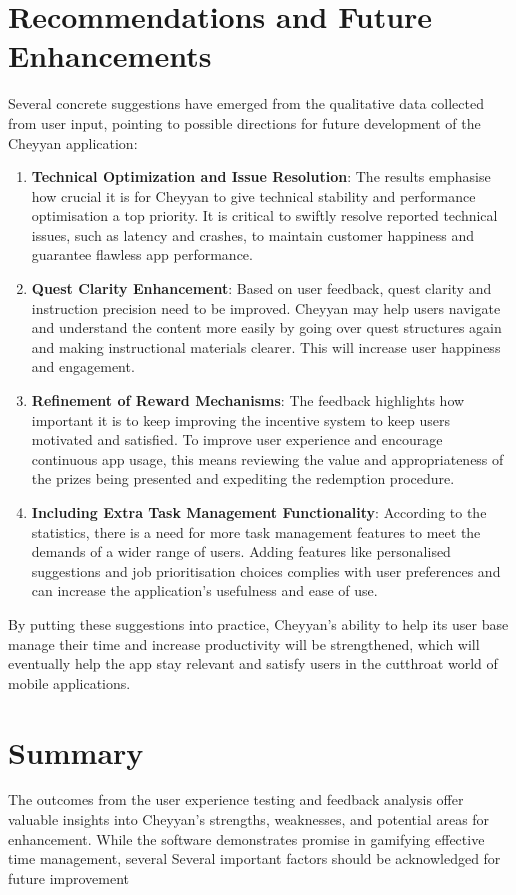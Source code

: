 \documentclass{l4proj}
\begin{document}
\section{Recommendations and Future Enhancements}
Several concrete suggestions have emerged from the qualitative data collected from user input, pointing to possible directions for future development of the Cheyyan application:

\begin{enumerate}
    \item \textbf{Technical Optimization and Issue Resolution}: The results emphasise how crucial it is for Cheyyan to give technical stability and performance optimisation a top priority. It is critical to swiftly resolve reported technical issues, such as latency and crashes, to maintain customer happiness and guarantee flawless app performance.
    
    \item \textbf{Quest Clarity Enhancement}: Based on user feedback, quest clarity and instruction precision need to be improved. Cheyyan may help users navigate and understand the content more easily by going over quest structures again and making instructional materials clearer. This will increase user happiness and engagement.
    
    \item \textbf{Refinement of Reward Mechanisms}: The feedback highlights how important it is to keep improving the incentive system to keep users motivated and satisfied. To improve user experience and encourage continuous app usage, this means reviewing the value and appropriateness of the prizes being presented and expediting the redemption procedure.
    
    \item \textbf{Including Extra Task Management Functionality}: According to the statistics, there is a need for more task management features to meet the demands of a wider range of users. Adding features like personalised suggestions and job prioritisation choices complies with user preferences and can increase the application's usefulness and ease of use.
\end{enumerate}

By putting these suggestions into practice, Cheyyan's ability to help its user base manage their time and increase productivity will be strengthened, which will eventually help the app stay relevant and satisfy users in the cutthroat world of mobile applications.

\section{Summary}
The outcomes from the user experience testing and feedback analysis offer valuable insights into Cheyyan's strengths, weaknesses, and potential areas for enhancement. While the software demonstrates promise in gamifying effective time management, several  Several important factors should be acknowledged for future improvement
\end{document}

